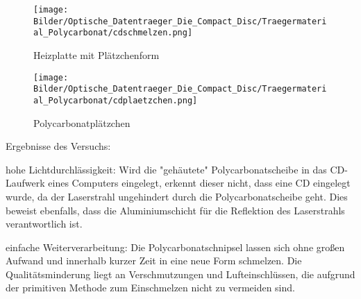 \begin{figure}[h]
    \begin{center}
        \begin{minipage}[t]{0.4\textwidth}
            \begin{center}
                \texttt{[image: Bilder/Optische\_Datentraeger\_Die\_Compact\_Disc/Traegermaterial\_Polycarbonat/cdschmelzen.png]}
                \caption[Heizplatte mit Plätzchenform]{Heizplatte mit Plätzchenform}
                \label{fig:cdschmelzen}
            \end{center}
        \end{minipage}
        \hspace{0.025\textwidth}
        \begin{minipage}[t]{0.4\textwidth}
            \begin{center}
                \texttt{[image: Bilder/Optische\_Datentraeger\_Die\_Compact\_Disc/Traegermaterial\_Polycarbonat/cdplaetzchen.png]}
                \caption[\glqq Polycarbonatplätzchen\grqq{}]{\glqq Polycarbonatplätzchen\grqq{}}
                \label{fig:cdplaetzchen}
            \end{center}
        \end{minipage}
    \end{center}
\end{figure}

Ergebnisse des Versuchs:
\begin{enumerate*}
    \item hohe Lichtdurchlässigkeit: Wird die "gehäutete" Polycarbonatscheibe in das CD-Laufwerk eines Computers eingelegt, erkennt dieser nicht, dass eine CD eingelegt wurde, da der Laserstrahl ungehindert durch die Polycarbonatscheibe geht. Dies beweist ebenfalls, dass die Aluminiumschicht für die Reflektion des Laserstrahls verantwortlich ist.
    \item einfache Weiterverarbeitung: Die Polycarbonatschnipsel lassen sich ohne großen Aufwand und innerhalb kurzer Zeit in eine neue Form schmelzen. Die Qualitätsminderung liegt an Verschmutzungen und Lufteinschlüssen, die aufgrund der primitiven Methode zum Einschmelzen nicht zu vermeiden sind.
\end{enumerate*}
